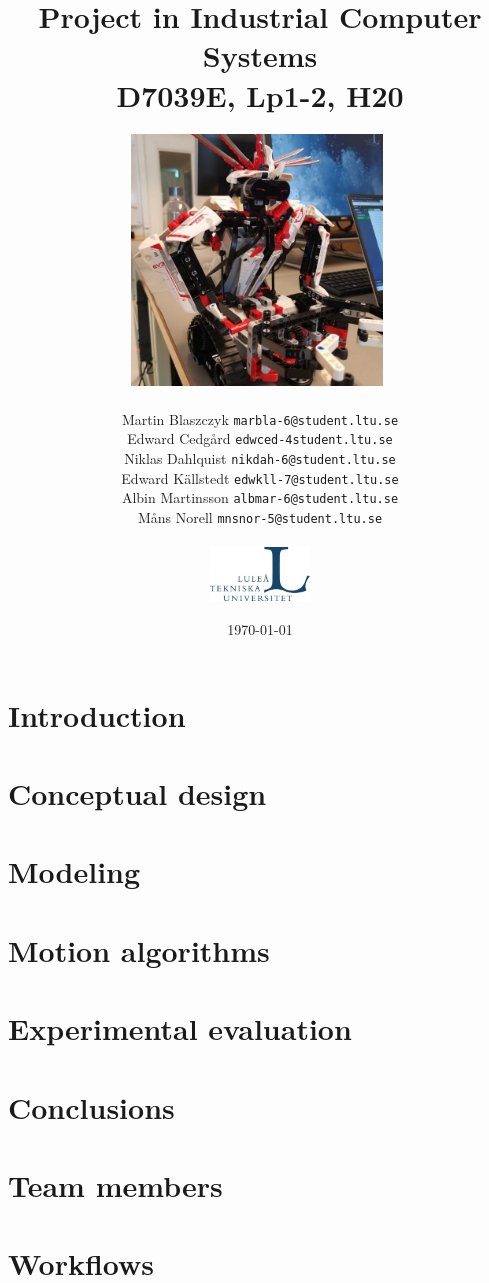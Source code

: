 \documentclass{report}
\title{Project in Industrial Computer Systems\\
D7039E, Lp1-2, H20}
\author{\includegraphics[width=0.5\textwidth]{chapters/img/robot.jpg}\ \\ \\
Martin Blaszczyk {\tt marbla-6@student.ltu.se}\\
Edward Cedgård {\tt edwced-4student.ltu.se}\\
Niklas Dahlquist {\tt nikdah-6@student.ltu.se}\\ 
Edward Källstedt {\tt edwkll-7@student.ltu.se}\\
Albin Martinsson {\tt albmar-6@student.ltu.se}\\
Måns Norell {\tt mnsnor-5@student.ltu.se}\\ \\
\includegraphics[width=0.2\textwidth]{chapters/img/ltu_swe.jpg}}
\date{\today}
\begin{document}
\maketitle
\begin{abstract}
\end{abstract}

\chapter*{Introduction}


\chapter*{Conceptual design}


\chapter*{Modeling}


\chapter*{Motion algorithms}


\chapter*{Experimental evaluation}


\chapter*{Conclusions}


\appendix
\chapter{Team members}


\chapter{Workflows}

 
\end{document}
